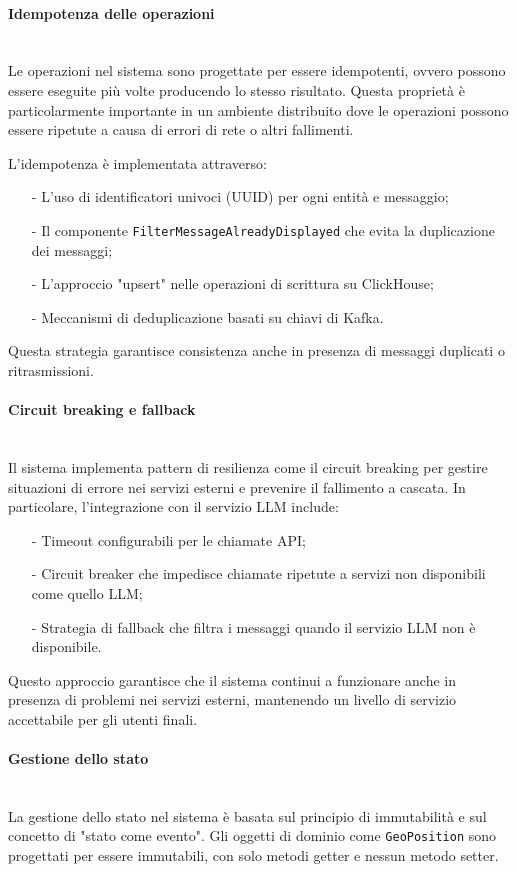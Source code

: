 \documentclass[10pt]{article}
\newcommand{\myparagraph}[1]{\paragraph{#1}\mbox{}\\}
\begin{document}
    \myparagraph{Idempotenza delle operazioni}
    Le operazioni nel sistema sono progettate per essere idempotenti, ovvero possono essere eseguite più volte producendo lo stesso risultato. Questa proprietà è particolarmente importante in un ambiente distribuito dove le operazioni possono essere ripetute a causa di errori di rete o altri fallimenti.

    L'idempotenza è implementata attraverso:
    \begin{itemize}
        \item[-] L'uso di identificatori univoci (UUID) per ogni entità e messaggio;
        \item[-] Il componente \texttt{FilterMessageAlreadyDisplayed} che evita la duplicazione dei messaggi;
        \item[-] L'approccio "upsert" nelle operazioni di scrittura su ClickHouse;
        \item[-] Meccanismi di deduplicazione basati su chiavi di Kafka.
    \end{itemize}

    Questa strategia garantisce consistenza anche in presenza di messaggi duplicati o ritrasmissioni.

    \myparagraph{Circuit breaking e fallback}
    Il sistema implementa pattern di resilienza come il circuit breaking per gestire situazioni di errore nei servizi esterni e prevenire il fallimento a cascata. In particolare, l'integrazione con il servizio LLM include:
    \begin{itemize}
        \item[-] Timeout configurabili per le chiamate API;
        \item[-] Circuit breaker che impedisce chiamate ripetute a servizi non disponibili come quello LLM;
        \item[-] Strategia di fallback che filtra i messaggi quando il servizio LLM non è disponibile.
    \end{itemize}

    Questo approccio garantisce che il sistema continui a funzionare anche in presenza di problemi nei servizi esterni, mantenendo un livello di servizio accettabile per gli utenti finali.

    \myparagraph{Gestione dello stato}
    La gestione dello stato nel sistema è basata sul principio di immutabilità e sul concetto di "stato come evento". Gli oggetti di dominio come \texttt{GeoPosition} sono progettati per essere immutabili, con solo metodi getter e nessun metodo setter.
\end{document}
